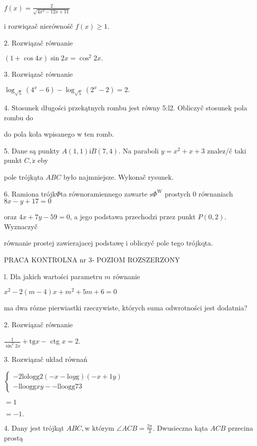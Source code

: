\documentclass[a4paper,12pt]{article}
\begin{document}
$f(x)=\displaystyle \frac{2}{\sqrt{4x^{2}-12x+11}}$

$\mathrm{i}$ rozwiqzač nierównośč $f(x)\geq 1.$

2. Rozwiązač równanie

$(1+\cos 4x)\sin 2x=\cos^{2}2x.$

3. Rozwiązač równanie

$\log_{\sqrt{5}}(4^{x}-6)-\log_{\sqrt{5}}(2^{x}-2)=2.$

4. Stosunek długości przekątnych rombu jest równy 5:l2. Obliczyč stosunek pola rombu do

do pola koła wpisanego $\mathrm{w}$ ten romb.

5. Dane są punkty $A(1,1)\mathrm{i}B(7,4)$. Na paraboli $y=x^{2}+x+3$ znalez/č taki punkt $C, \dot{\mathrm{z}}$ eby

pole trójkąta $ABC$ było najmniejsze. Wykonač rysunek.

6. Ramiona trójk$\Phi$ta równoramiennego zawarte $\mathrm{s}\Phi^{\mathrm{W}}$ prostych $0$ równaniach $8x-y+17=0$

oraz $4x+7y-59 = 0$, a jego podstawa przechodzi przez punkt $P(0,2)$. Wyznaczyč

równanie prostej zawierajacej podstawę $\mathrm{i}$ obliczyč pole tego trójkqta.




PRACA KONTROLNA nr 3- POZIOM ROZSZERZONY

l. Dla jakich wartości parametru $m$ równanie

$x^{2}-2(m-4)x+m^{2}+5m+6=0$

ma dwa rózne pierwiastki rzeczywiste, których suma odwrotności jest dodatnia?

2. Rozwiązač równanie

$\displaystyle \frac{1}{\sin^{2}2x}+\mathrm{t}\mathrm{g}x-$ ctg $x=2.$

3. Rozwiązač układ równań

$\left\{\begin{array}{l}
- 2\mathrm{l}\mathrm{o}\mathrm{l}\mathrm{o}\mathrm{g}\mathrm{g}2(- x- \mathrm{l}\mathrm{o}y\mathrm{g})(- x+1y)\\
- \mathrm{l}\mathrm{l}\mathrm{o}\mathrm{o}\mathrm{g}\mathrm{g}xy-- \mathrm{l}\mathrm{l}\mathrm{o}\mathrm{o}\mathrm{g}\mathrm{g}73
\end{array}\right.$

$=1$

$=-1.$

4. Dany jest trójkąt $ABC, \mathrm{w}$ którym $\displaystyle \angle ACB=\frac{2\pi}{3}$. Dwusieczna kąta $ACB$ przecina prostą
\end{document}
